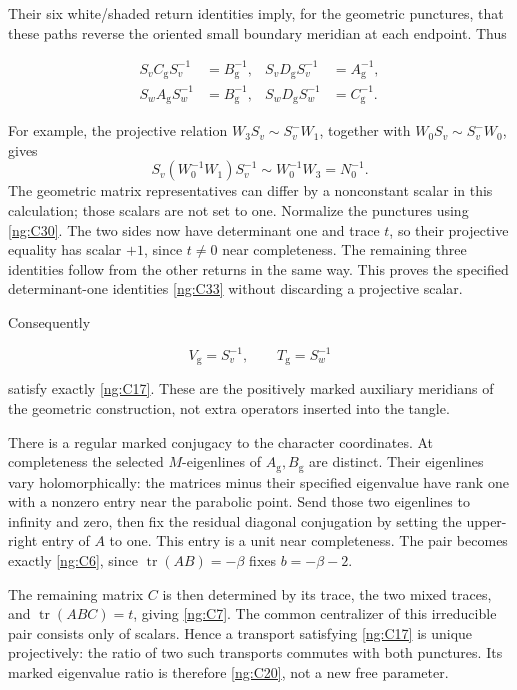 Their six white/shaded return identities imply, for the geometric punctures, that these paths reverse the oriented small boundary meridian at each endpoint. Thus

\begin{equation}\label{ng:C33}
\begin{aligned}
 S_vC_{\mathrm g}S_v^{-1}&=B_{\mathrm g}^{-1},
 &S_vD_{\mathrm g}S_v^{-1}&=A_{\mathrm g}^{-1},\\
 S_wA_{\mathrm g}S_w^{-1}&=B_{\mathrm g}^{-1},
 &S_wD_{\mathrm g}S_w^{-1}&=C_{\mathrm g}^{-1}.
 \end{aligned}
\end{equation}

For example, the projective relation \(W_3S_v\sim S_v^-W_1\), together with
\(W_0S_v\sim S_v^-W_0\), gives
\[
 S_v(W_0^{-1}W_1)S_v^{-1}\sim W_0^{-1}W_3=N_0^{-1}.
\]
The geometric matrix representatives can differ by a nonconstant scalar in this calculation; those scalars are not set to one. Normalize the punctures using \eqref{ng:C30}. The two sides now have determinant one and trace \(t\), so their projective equality has scalar \(+1\), since \(t\ne0\) near completeness. The remaining three identities follow from the other returns in the same way. This proves the specified determinant-one identities \eqref{ng:C33} without discarding a projective scalar.

Consequently

\begin{equation}\label{ng:C34}
V_{\mathrm g}=S_v^{-1},\qquad
                       T_{\mathrm g}=S_w^{-1}
\end{equation}

satisfy exactly \eqref{ng:C17}. These are the positively marked auxiliary meridians of the geometric construction, not extra operators inserted into the tangle.

There is a regular marked conjugacy to the character coordinates. At completeness the selected \(M\)-eigenlines of \(A_{\mathrm g},B_{\mathrm g}\) are distinct. Their eigenlines vary holomorphically: the matrices minus their specified eigenvalue have rank one with a nonzero entry near the parabolic point. Send those two eigenlines to infinity and zero, then fix the residual diagonal conjugation by setting the upper-right entry of \(A\) to one. This entry is a unit near completeness. The pair becomes exactly \eqref{ng:C6}, since \(\operatorname{tr}(AB)=-\beta\) fixes \(b=-\beta-2\).

The remaining matrix \(C\) is then determined by its trace, the two mixed traces, and \(\operatorname{tr}(ABC)=t\), giving \eqref{ng:C7}. The common centralizer of this irreducible pair consists only of scalars. Hence a transport satisfying \eqref{ng:C17} is unique projectively: the ratio of two such transports commutes with both punctures. Its marked eigenvalue ratio is therefore \eqref{ng:C20}, not a new free parameter.

